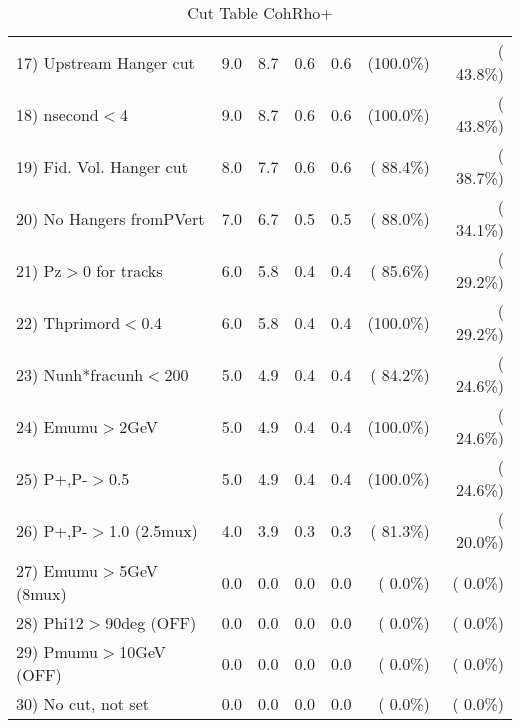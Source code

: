 \begin{table}[h!]
\begin{tabular}{||l||r|r|r|r|r|r||}
 17) Upstream Hanger cut  &          9.0 &          8.7 &          0.6 &          0.6 & (100.0\%) & ( 43.8\%) \\
 18) nsecond$<$4          &          9.0 &          8.7 &          0.6 &          0.6 & (100.0\%) & ( 43.8\%) \\
 19) Fid. Vol. Hanger cut &          8.0 &          7.7 &          0.6 &          0.6 & ( 88.4\%) & ( 38.7\%) \\
 20) No Hangers fromPVert &          7.0 &          6.7 &          0.5 &          0.5 & ( 88.0\%) & ( 34.1\%) \\
 21) Pz$>$0 for tracks    &          6.0 &          5.8 &          0.4 &          0.4 & ( 85.6\%) & ( 29.2\%) \\
 22) Thprimord$<$0.4      &          6.0 &          5.8 &          0.4 &          0.4 & (100.0\%) & ( 29.2\%) \\
 23) Nunh*fracunh$<$200   &          5.0 &          4.9 &          0.4 &          0.4 & ( 84.2\%) & ( 24.6\%) \\
 24) Emumu$>$2GeV         &          5.0 &          4.9 &          0.4 &          0.4 & (100.0\%) & ( 24.6\%) \\
 25) P+,P-$>$0.5          &          5.0 &          4.9 &          0.4 &          0.4 & (100.0\%) & ( 24.6\%) \\
 26) P+,P-$>$1.0 (2.5mux) &          4.0 &          3.9 &          0.3 &          0.3 & ( 81.3\%) & ( 20.0\%) \\
 27) Emumu$>$5GeV  (8mux) &          0.0 &          0.0 &          0.0 &          0.0 & (  0.0\%) & (  0.0\%) \\
 28) Phi12$>$90deg  (OFF) &          0.0 &          0.0 &          0.0 &          0.0 & (  0.0\%) & (  0.0\%) \\
 29) Pmumu$>$10GeV  (OFF) &          0.0 &          0.0 &          0.0 &          0.0 & (  0.0\%) & (  0.0\%) \\
 30) No cut, not set      &          0.0 &          0.0 &          0.0 &          0.0 & (  0.0\%) & (  0.0\%) \\
 \hline
 \hline
 \end{tabular}
 \caption{Cut Table  CohRho+  }
 \label{tab-cutcohjpsi-mumu_anumunc}
 \end{table}
